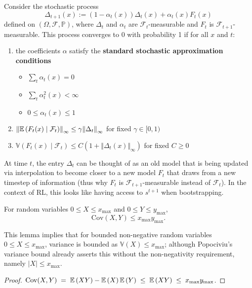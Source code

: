 \documentclass[twoside,10pt]{report}
\begin{document}
\begin{thrm}[Jaakkola et al.]
Consider the stochastic process
\[
\Delta_{t+1}(x) := (1-\alpha_{t}(x)) \Delta_{t}(x) + \alpha_{t}(x) F_{t}(x)
\] defined on $(\Omega,\mathcal{F},\mathbb{P})$, where $\Delta_{t}$ and $\alpha_{t}$ are $\mathcal{F}_{t}$-measurable and $F_{t}$ is $\mathcal{F}_{t+1}$-measurable. This process converges to 0 with probability 1 if for all $x$ and $t$:
\begin{enumerate}
	\item the coefficients $\alpha$ satisfy the \textbf{standard stochastic approximation conditions}
		\begin{itemize}
			\item $\sum_{t}\alpha_{t}(x) = 0$ 
			\item $\sum_{t}\alpha_{t}^2(x) < \infty$ 
			\item $0 \leq \alpha_{t}(x) \leq 1$
		\end{itemize}
	\item ${\Vert{\mathbb{E} \left(  F_{t}(x) \;|\; \mathcal{F}_{t}  \right)}\Vert}_{\infty} \leq \gamma {\Vert{\Delta_{t}}\Vert}_{\infty}$ for fixed $\gamma \in [0, 1)$
	\item $\mathbb{V}\left( F_{t}(x) \;|\; \mathcal{F}_{t} \right) \leq C \left( 1 + {\Vert{\Delta_{t}(x)}\Vert}_{\infty} \right)$ for fixed $C \geq 0$
\end{enumerate}
\end{thrm}

At time $t$, the entry $\Delta_{t}$ can be thought of as an old model that is being updated via interpolation to become closer to a new model $F_{t}$ that draws from a new timestep of information (thus why $F_{t}$ is $\mathcal{F}_{t+1}$-measurable instead of $\mathcal{F}_{t}$). In the context of RL, this looks like having access to $s^{t+1}$ when bootstrapping.


\begin{lem}
For random variables $0 \leq X \leq x_{\text{max}}$ and $0 \leq Y \leq y_{\text{max}}$,
\[
\text{Cov}(X,Y) \leq x_{\text{max}} y_{\text{max}}.
\]
\end{lem}
This lemma implies that for bounded non-negative random variables $0 \leq X \leq x_{\text{max}}$, variance is bounded as $\mathbb{V}(X) \leq x_{\text{max}}$; although Popociviu's variance bound already asserts this without the non-negativity requirement, namely $|X| \leq x_{\text{max}}$.
\begin{proof}
	$\text{Cov}(X,Y) \;=\; \mathbb{E} \left(  XY  \right) - \mathbb{E} \left(  X  \right)\mathbb{E} \left(  Y  \right) \;\leq\; \mathbb{E} \left(  XY  \right) \;\leq\; x_{\text{max}}y_{\text{max}}$.
\end{proof}
\end{document}
